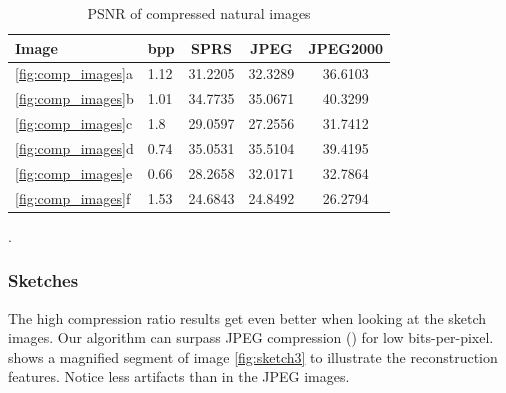 \begin{table}[h]
\centering

\begin{tabular}{| l l | c | c | c|}
\hline\hline
Image & bpp & SPRS & JPEG & JPEG2000 \\
\hline
\ref{fig:comp_images}a & 1.12 & 31.2205 & 32.3289 & 36.6103 \\
\hline
\ref{fig:comp_images}b & 1.01 & 34.7735 & 35.0671 & 40.3299 \\
\hline
\ref{fig:comp_images}c & 1.8  & 29.0597 & 27.2556 & 31.7412 \\
\hline
\ref{fig:comp_images}d & 0.74 & 35.0531 & 35.5104 & 39.4195 \\
\hline
\ref{fig:comp_images}e & 0.66 & 28.2658 & 32.0171 & 32.7864 \\
\hline
\ref{fig:comp_images}f & 1.53 & 24.6843  & 24.8492 & 26.2794 \\
\hline
\end{tabular}
\caption{PSNR of compressed natural images}
\label{tab:compression1}.
\end{table} 


\subsubsection{Sketches}
The high compression ratio results get even better when looking at the sketch
images. Our algorithm can surpass JPEG compression
() for low bits-per-pixel.
 shows a magnified segment of image
\ref{fig:sketch3} to illustrate the reconstruction features. Notice less
artifacts than in the JPEG images.

